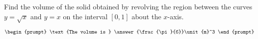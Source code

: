 \documentclass{ximera}
\author{Gregory Hartman \and Matthew Carr}
\begin{document}
\begin{exercise}






Find the volume of the solid obtained by revolving the region between the curves $y=\sqrt{x}$ and $y=x$ on the interval $[0,1]$ about the $x$-axis.

\[
\begin{prompt}
\text{The volume is } \answer{\frac{\pi}{6}}\unit{m}^3
\end{prompt}
\]




\end{exercise}
\end{document}
